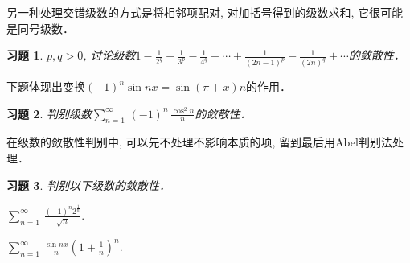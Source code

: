 \documentclass[11pt,a4paper]{ctexart}
\makeatletter
\theoremstyle{thmseries} %
\theoremstyle{exerseries}
\newtheorem{exer}{习题}[section]
\renewenvironment{proof}[1][\proofname]{\par
  \pushQED{\qed}%
  \normalfont \topsep6\p@\@plus6\p@\relax
  \trivlist
  \item[\hskip\labelsep
        \itshape
    #1\@addpunct{}]\ignorespaces
}{%
  \popQED\endtrivlist\@endpefalse
}
\newenvironment{pf}{\begin{proof}[\bfseries\upshape 证\quad]}{\end{proof}}
\newcommand{\bra}[1]{\mathopen{}\left(#1\right)}
\newcommand{\sbra}[1]{\mathopen{}\left[#1\right]}
\def \tseries {{\textstyle\sum\limits_{n=1}^{\infty}}\,} %
\def \dseries {\sum_{n=1}^{\infty}\,} %
\makeatother
\begin{document}

另一种处理交错级数的方式是将相邻项配对, 对加括号得到的级数求和, 它很可能是同号级数．

\begin{exer}
	$p,q>0$, 讨论级数$1-\frac{1}{2^q}+\frac{1}{3^p}-\frac{1}{4^q}+\cdots+\frac{1}{(2n-1)^p}-\frac{1}{(2n)^q}+\cdots$的敛散性．
\end{exer}

下题体现出变换$(-1)^n\sin nx=\sin(\pi+x)n$的作用．
\begin{exer}
	判别级数$\tseries(-1)^n\,\frac{\cos^2n}{n}$的敛散性．
\end{exer}

在级数的敛散性判别中, 可以先不处理不影响本质的项, 留到最后用Abel判别法处理．
\begin{exer}
	判别以下级数的敛散性．\vspace{-.5em}
	\begin{enumerate}
	\end{enumerate}
\end{exer}
\end{document}
